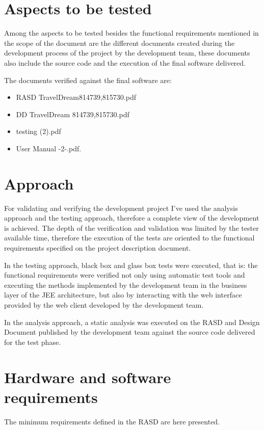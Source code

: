 \documentclass[a4paper,12pt]{book}
\begin{document}
\section{Aspects to be tested}
Among the aspects to be tested besides the functional requirements mentioned in the scope of the document are the different documents created during the development process of the project by the development team, these documents also include the source code and the execution of the final software delivered.\newline

The documents verified against the final software are:
\begin{itemize}
  \item RASD TravelDream814739,815730.pdf
  \item DD TravelDream 814739,815730.pdf
  \item testing (2).pdf
  \item User Manual -2-.pdf.
\end{itemize}

\section{Approach}
For validating and verifying the development project I've used the analysis approach and the testing approach, therefore a complete view of the development is achieved. The depth of the verification and validation was limited by the tester available time, therefore the execution of the tests are oriented to the functional requirements specified on the project description document.

In the testing approach, black box and glass box tests were executed, that is: the functional requirements were verified not only using automatic test tools and executing the methods implemented by the development team in the business layer of the JEE architecture, but also by interacting with the web interface provided by the web client developed by the development team.

In the analysis approach, a static analysis was executed on the RASD and Design Document published by the development team against the source code delivered for the test phase.

\section{Hardware and software requirements}
The minimum requirements defined in the RASD are here presented.
\end{document}

